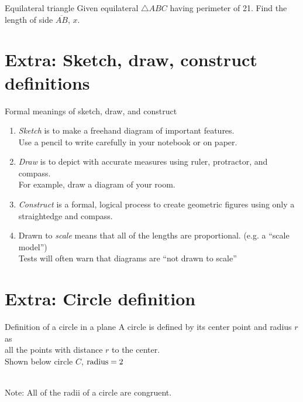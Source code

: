 \begin{frame}{Equilateral triangle}
  Given equilateral $\triangle ABC$ having perimeter of 21. Find the length of side $\overline{AB}$, $x$. \vspace{1cm}
  \begin{center}
  \end{center}
\end{frame}

\section{Extra: Sketch, draw, construct definitions}
\begin{frame}{Formal meanings of sketch, draw, and construct}
  \begin{enumerate}
    \item \emph{Sketch} is to make a freehand diagram of important features. \\[0.15cm]
    Use a pencil to write carefully in your notebook or on paper.  \smallskip
    \item \emph{Draw}  is to depict with accurate measures using ruler, protractor, and compass.\\[0.15cm]
    For example, draw a diagram of your room. \smallskip
    \item \emph{Construct} is a formal, logical process to create geometric figures using only a straightedge and compass. \smallskip
    \item Drawn to \emph{scale} means that all of the lengths are proportional. (e.g. a ``scale model'')\\[0.15cm]
    Tests will often warn that diagrams are ``not drawn to scale''
  \end{enumerate}
\end{frame}

\section{Extra: Circle definition}
\begin{frame}{Definition of a circle in a plane}
  A circle is defined by its center point and radius $r$ as\\
  all the points with distance $r$ to the center. \\[0.5cm]
  Shown below circle $C$, $\rm{radius}=2$\\[0.5cm]
    \\
  Note: All of the radii of a circle are congruent.
    \end{frame}
  
